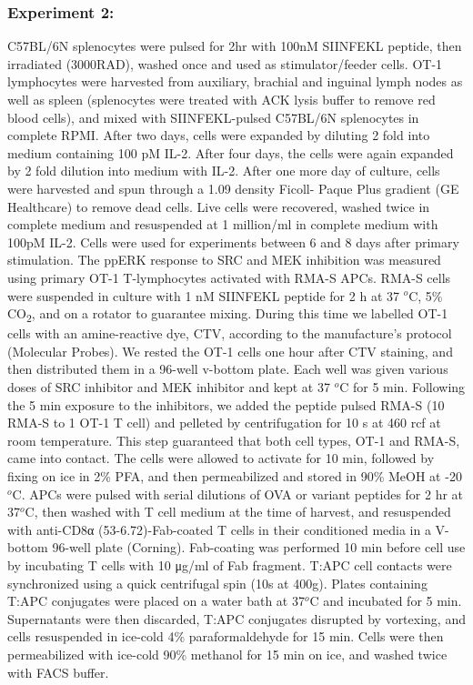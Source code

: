 \documentclass[11pt,a4paper,draft]{article}
\begin{document}
\subsubsection*{Experiment 2:} C57BL/6N splenocytes were pulsed for 2hr with 100nM SIINFEKL peptide, then irradiated (3000RAD), washed once and used as stimulator/feeder cells. OT-1 lymphocytes were harvested from auxiliary, brachial and inguinal lymph nodes as well as spleen (splenocytes were treated with ACK lysis buffer to remove red blood cells), and mixed with SIINFEKL-pulsed C57BL/6N splenocytes in complete RPMI. After two days, cells were expanded by diluting 2 fold into medium containing 100 pM IL-2. After four days, the cells were again expanded by 2 fold dilution into medium with IL-2. After one more day of culture, cells were harvested and spun through a 1.09 density Ficoll- Paque Plus gradient (GE Healthcare) to remove dead cells. Live cells were recovered, washed twice in complete medium and resuspended at 1 million/ml in complete medium with 100pM IL-2. Cells were used for experiments between 6 and 8 days after primary stimulation. The ppERK response to SRC and MEK inhibition was measured using primary OT-1 T-lymphocytes activated with RMA-S APCs. RMA-S cells were suspended in culture with 1 nM SIINFEKL peptide for 2 h at 37 $^o$C, 5\% CO\textsubscript{2}, and on a rotator to guarantee mixing. During this time we labelled OT-1 cells with an amine-reactive dye, CTV, according to the manufacture’s protocol (Molecular Probes). We rested the OT-1 cells one hour after CTV staining, and then distributed them in a 96-well v-bottom plate. Each well was given various doses of SRC inhibitor and MEK inhibitor and kept at 37 $^o$C for 5 min. Following the 5 min exposure to the inhibitors, we added the peptide pulsed RMA-S (10 RMA-S to 1 OT-1 T cell) and pelleted by centrifugation for 10 s at 460 rcf at room temperature. This step guaranteed that both cell types, OT-1 and RMA-S, came into contact. The cells were allowed to activate for 10 min, followed by fixing on ice in 2\% PFA, and then permeabilized and stored in 90\% MeOH at  -20 $^o$C. APCs were pulsed with serial dilutions of OVA or variant peptides for 2 hr at 37$^o$C, then washed with T cell medium at the time of harvest, and resuspended with anti-CD8α (53-6.72)-Fab-coated T cells in their conditioned media in a V-bottom 96-well plate (Corning). Fab-coating was performed 10 min before cell use by incubating T cells with 10 μg/ml of Fab fragment. T:APC cell contacts were synchronized using a quick centrifugal spin (10s at 400g). Plates containing T:APC conjugates were placed on a water bath at 37$^o$C and incubated for 5 min. Supernatants were then discarded, T:APC conjugates disrupted by vortexing, and cells resuspended in ice-cold 4\% paraformaldehyde for 15 min. Cells were then permeabilized with ice-cold 90\% methanol for 15 min on ice, and washed twice with FACS buffer. 
\end{document}

